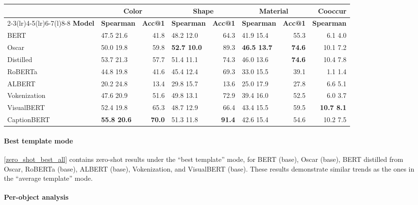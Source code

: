 \documentclass[11pt]{article}
\begin{document}
\begin{table*}[ht]
\small
\centering
\begin{tabular}{l|lr|lr|lr|r}
\hline
& \multicolumn{2}{c|}{\textbf{Color}} & \multicolumn{2}{c|}{\textbf{Shape}} & \multicolumn{2}{c|}{\textbf{Material}} & \textbf{Cooccur}\\
\cmidrule(lr){2-3}\cmidrule(lr){4-5}\cmidrule(lr){6-7}\cmidrule(l){8-8}
\textbf{Model} & \textbf{Spearman } & \textbf{Acc@1} & \textbf{Spearman } & \textbf{Acc@1} & \textbf{Spearman } & \textbf{Acc@1} & \textbf{Spearman }\\
\hline
BERT & 47.5  21.6 & 41.8 & 48.2  12.0 & 64.3 & 41.9  15.4 & 55.3 & 6.1  4.0\\
Oscar & 50.0  19.8 & 59.8 & \textbf{52.7  10.0} & 89.3 & \textbf{46.5  13.7} & \textbf{74.6} & 10.1  7.2\\
Distilled & 53.7  21.3 & 57.7 & 51.4  11.1 & 74.3 & 46.0  13.6 & \textbf{74.6} & 10.4  7.8\\
RoBERTa & 44.8  19.8 & 41.6 & 45.4  12.4 & 69.3 & 33.0  15.5 & 39.1 & 1.1  1.4\\
ALBERT & 20.2  24.8 & 13.4 & 29.8  15.7 & 13.6 & 25.0  17.9 & 27.8 & 6.6  5.1\\
Vokenization & 47.6  20.9 & 51.6 & 49.8  13.1 & 72.9 & 39.4  16.0 & 52.5 & 6.0  3.7\\
VisualBERT & 52.4  19.8 & 65.3 & 48.7  12.9 & 66.4 & 43.4  15.5 & 59.5 & \textbf{10.7  8.1}\\
CaptionBERT & \textbf{55.8  20.6} & \textbf{70.0} & 51.3  11.8 & \textbf{91.4} & 42.6  15.4 & 54.6 & 10.2  7.5\\
\hline
\end{tabular}
\caption{\label{zero_shot_best_all}
Spearman correlation and top-1 accuracy (both  100) of zero shot probing. This is the ``best template'' case discussed in \cref{models}.}
\end{table*}

\paragraph{Best template mode}
\label{sec:zero-shot}
\cref{zero_shot_best_all} contains zero-shot results under the ``best template'' mode, for BERT (base), Oscar (base), BERT distilled from Oscar, RoBERTa (base), ALBERT (base), Vokenization, and VisualBERT (base). These results demonstrate similar trends as the ones in the ``average template'' mode.


\paragraph{Per-object analysis}
\end{document}
